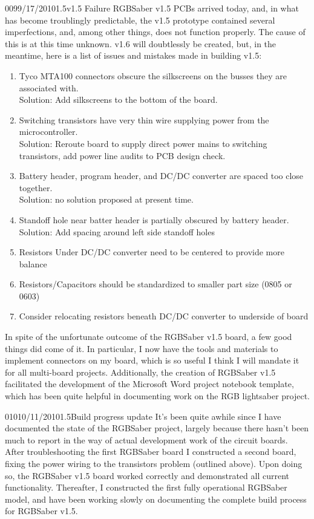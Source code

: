 \documentclass[12pt,letterpaper,onecolumn]{article}
\begin{document}
\begin{nbentry}{009}{9/17/2010}{1.5}{v1.5 Failure}
	RGBSaber v1.5 PCBs arrived today, and, in what has become troublingly predictable, the v1.5 prototype contained several imperfections, and, among other things, does not function properly. The cause of this is at this time unknown. v1.6 will doubtlessly be created, but, in the meantime, here is a list of issues and mistakes made in building v1.5:
\begin{enumerate}
\item Tyco MTA100 connectors obscure the silkscreens on the busses they are associated with. \\
	Solution: Add silkscreens to the bottom of the board.
\item Switching transistors have very thin wire supplying power from the microcontroller. \\
	Solution: Reroute board to supply direct power mains to switching transistors, add power line audits to PCB design check.
\item Battery header, program header, and DC/DC converter are spaced too close together. \\
	Solution: no solution proposed at present time.
\item Standoff hole near batter header is partially obscured by battery header. \\
	Solution: Add spacing around left side standoff holes
\item Resistors Under DC/DC converter need to be centered to provide more balance
\item Resistors/Capacitors should be standardized to smaller part size (0805 or 0603)
\item Consider relocating resistors beneath DC/DC converter to underside of board
\end{enumerate}
	In spite of the unfortunate outcome of the RGBSaber v1.5 board, a few good things did come of it. In particular, I now have the tools and materials to implement connectors on my board, which is so useful I think I will mandate it for all multi-board projects. Additionally, the creation of RGBSaber v1.5 facilitated the development of the Microsoft Word project notebook template, which has been quite helpful in documenting work on the RGB lightsaber project.
\end{nbentry}

\begin{nbentry}{010}{10/11/2010}{1.5}{Build progress update}
	It's been quite awhile since I have documented the state of the RGBSaber project, largely because there hasn't been much to report in the way of actual development work of the circuit boards. After troubleshooting the first RGBSaber board I constructed a second board, fixing the power wiring to the transistors problem (outlined above). Upon doing so, the RGBSaber v1.5 board worked correctly and demonstrated all current functionality. Thereafter, I constructed the first fully operational RGBSaber model, and have been working slowly on documenting the complete build process for RGBSaber v1.5.
\end{nbentry}
\end{document}

